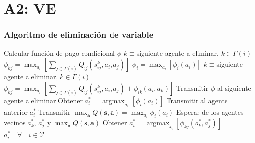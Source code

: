 \documentclass[11pt]{beamer}
\DeclareMathOperator*{\argmax}{argmax}
\begin{document}
\section{A2: VE}
\begin{frame}
\frametitle{Algoritmo de eliminación de variable}
\tiny
\begin{algorithmic}[1]
	\State Calcular función de pago condicional $\phi$
		\State $k \equiv $siguiente agente a eliminar, $k\in \Gamma(i)$
		\State $\phi_{kj}=\max_{a_i}\left[\sum_{j \in \Gamma(i)}Q_{ij}(s_{ij}^k,a_i,a_j)\right]$
		\State $\phi_i=\max_{a_i}[\phi_i(a_i)]$	
	\Else
		\State $k \equiv $siguiente agente a eliminar, $k\in \Gamma(i)$
		\State $\phi_{kj}=\max_{a_i}\left[\sum_{j \in \Gamma(i)}Q_{ij}(s_{ij}^k,a_i,a_j)+\phi_{ik}(a_i,a_k)\right]$
	\EndIf
	\State Transmitir $\phi$ al siguiente agente a eliminar
\EndFor
\Statex
{}
		\State Obtener $a_i^*=\argmax_{a_i}[\phi_i(a_i)]$
		\State Transmitir al agente anterior $a_i^*$
		\State Transmitir $\max_{\mathbf{a}}Q(\mathbf{s},\mathbf{a})=\max_{a_i}\phi_i(a_i)$
	\Else
		\State Esperar de los agentes vecinos $a_k^*$, $a_j^*$ y $\max_{\mathbf{a}}Q(\mathbf{s},\mathbf{a})$
		\State Obtener $a_i^*=\argmax_{a_i}[\phi_{kj}(a_k^*,a_j^*)]$
	\EndIf
\EndFor
\State \Return $a_i^* \quad \forall \quad i \in \mathcal{V}$
\EndFunction
\end{algorithmic}
\end{frame}
\end{document}
